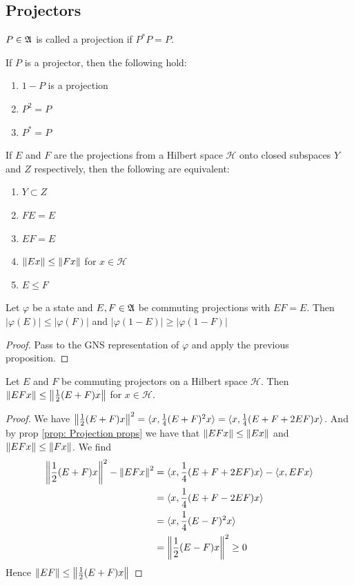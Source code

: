 \documentclass[11pt]{amsart}
\begin{document}
\subsection{Projectors}
\begin{defn}
    $P\in\mathfrak{A}$ is called a projection if $P^*P=P$.
\end{defn}
\begin{lem}
    If $P$ is a projector, then the following hold:
    \begin{enumerate}
        \item $1-P$ is a projection
        \item $P^2=P$
        \item $P^*=P$
    \end{enumerate}
\end{lem}
\begin{prop}\label{prop: Projection props}
    If $E$ and $F$ are the projections from a Hilbert space $\mathcal H$ onto closed subspaces $Y$ and $Z$ respectively, then the following are equivalent:
    \begin{enumerate}
        \item $Y\subset Z$
        \item $FE=E$
        \item $EF=E$
        \item $\left\lVert Ex\right\rVert\leq \left\lVert Fx\right\rVert$ for $x\in\mathcal H$
        \item $E\leq F$
    \end{enumerate}
\end{prop}
\begin{lem}
    Let $\varphi$ be a state and $E,F\in \mathfrak{A}$ be commuting projections with $EF=E$. Then $|\varphi(E)|\leq|\varphi(F)|$ and $|\varphi(1-E)|\geq|\varphi(1-F)|$
    \begin{proof}
        Pass to the GNS representation of $\varphi$ and apply the previous proposition. 
    \end{proof}
\end{lem}
\begin{lem}
    Let $E$ and $F$ be commuting projectors on a Hilbert space $\mathcal H$. Then  $\left\lVert EFx\right\rVert\leq\left\lVert \frac{1}{2}(E+F)x\right\rVert$ for $x\in\mathcal H$.
    \begin{proof}
    We have $\left\lVert \frac{1}{2}(E+F)x\right\rVert^2=\langle x,\frac{1}{4}(E+F)^2x\rangle=\langle x,\frac{1}{4}(E+F+2EF)x\rangle$. And by prop \ref{prop: Projection props}  we have that $\left\lVert EFx\right\rVert\leq \left\lVert Ex\right\rVert$ and $\left\lVert EFx\right\rVert\leq \left\lVert Fx\right\rVert$. We find
    \begin{align*}
        \left\lVert \frac{1}{2}(E+F)x\right\rVert^2-\left\lVert EFx\right\rVert^2&=\langle x,\frac{1}{4}(E+F+2EF)x\rangle- \langle x,EFx\rangle\\
        &= \langle x, \frac{1}{4}(E+F-2EF)x\rangle \\
        & = \langle x,\frac{1}{4}(E-F)^2x\rangle \\
        &= \left\lVert \frac{1}{2}(E-F)x\right\rVert^2 \geq 0
    \end{align*}
    Hence $\left\lVert EF\right\rVert\leq \left\lVert \frac{1}{2}(E+F)x\right\rVert$ 
    \end{proof}
\end{lem}
\end{document}
